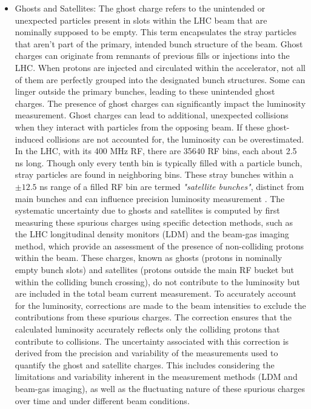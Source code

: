 \begin{itemize}
\item Ghosts and Satellites: The ghost charge refers to the unintended or unexpected particles present in slots within the LHC beam that are nominally supposed to be empty. This term encapsulates the stray particles that aren't part of the primary, intended bunch structure of the beam. Ghost charges can originate from remnants of previous fills or injections into the LHC. When protons are injected and circulated within the accelerator, not all of them are perfectly grouped into the designated bunch structures. Some can linger outside the primary bunches, leading to these unintended ghost charges. The presence of ghost charges can significantly impact the luminosity measurement. Ghost charges can lead to additional, unexpected collisions when they interact with particles from the opposing beam. If these ghost-induced collisions are not accounted for, the luminosity can be overestimated. In the LHC, with its 400 MHz RF, there are 35640 RF bins, each about 2.5 ns long. Though only every tenth bin is typically filled with a particle bunch, stray particles are found in neighboring bins. These stray bunches within a \(\pm 12.5 \) ns range of a filled RF bin are termed \textit{"satellite bunches"}, distinct from main bunches and can influence precision luminosity measurement \cite{Alici:1427728}.
The systematic uncertainty due to ghosts and satellites is computed by first measuring these spurious charges using specific detection methods, such as the LHC longitudinal density monitors (LDM) and the beam-gas imaging method, which provide an assessment of the presence of non-colliding protons within the beam. These charges, known as ghosts (protons in nominally empty bunch slots) and satellites (protons outside the main RF bucket but within the colliding bunch crossing), do not contribute to the luminosity but are included in the total beam current measurement. To accurately account for the luminosity, corrections are made to the beam intensities to exclude the contributions from these spurious charges. The correction ensures that the calculated luminosity accurately reflects only the colliding protons that contribute to collisions. The uncertainty associated with this correction is derived from the precision and variability of the measurements used to quantify the ghost and satellite charges. This includes considering the limitations and variability inherent in the measurement methods (LDM and beam-gas imaging), as well as the fluctuating nature of these spurious charges over time and under different beam conditions.


\end{itemize}
